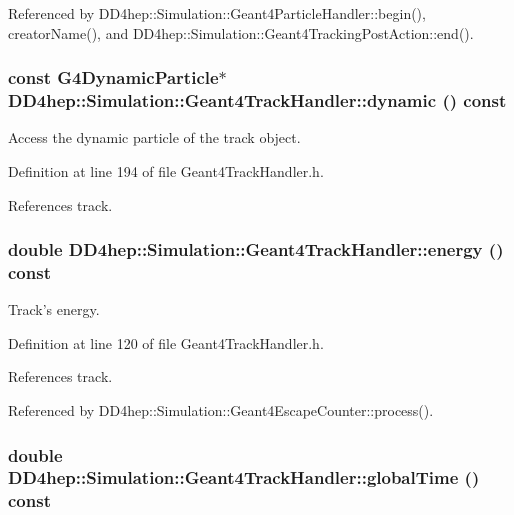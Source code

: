Referenced by DD4hep::Simulation::Geant4ParticleHandler::begin(), creatorName(), and DD4hep::Simulation::Geant4TrackingPostAction::end().\hypertarget{class_d_d4hep_1_1_simulation_1_1_geant4_track_handler_a3348efba5ab5cda2b8d918974482fe63}{
\subsubsection[{dynamic}]{\setlength{\rightskip}{0pt plus 5cm}const G4DynamicParticle$\ast$ DD4hep::Simulation::Geant4TrackHandler::dynamic () const}}
\label{class_d_d4hep_1_1_simulation_1_1_geant4_track_handler_a3348efba5ab5cda2b8d918974482fe63}


Access the dynamic particle of the track object. 

Definition at line 194 of file Geant4TrackHandler.h.

References track.\hypertarget{class_d_d4hep_1_1_simulation_1_1_geant4_track_handler_a99dc1b9082ce4f63fa2501010c3b4a4e}{
\subsubsection[{energy}]{\setlength{\rightskip}{0pt plus 5cm}double DD4hep::Simulation::Geant4TrackHandler::energy () const}}
\label{class_d_d4hep_1_1_simulation_1_1_geant4_track_handler_a99dc1b9082ce4f63fa2501010c3b4a4e}


Track's energy. 

Definition at line 120 of file Geant4TrackHandler.h.

References track.

Referenced by DD4hep::Simulation::Geant4EscapeCounter::process().\hypertarget{class_d_d4hep_1_1_simulation_1_1_geant4_track_handler_a898c62c8e1639fd059d8dfd97fecf2d1}{
\subsubsection[{globalTime}]{\setlength{\rightskip}{0pt plus 5cm}double DD4hep::Simulation::Geant4TrackHandler::globalTime () const}}
\label{class_d_d4hep_1_1_simulation_1_1_geant4_track_handler_a898c62c8e1639fd059d8dfd97fecf2d1}


